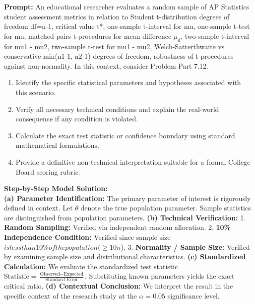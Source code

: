 \begin{workbookbox}
\textbf{Prompt:} An educational researcher evaluates a random sample of AP Statistics student assessment metrics in relation to Student t-distribution degrees of freedom df=n-1, critical value t*, one-sample t-interval for mu, one-sample t-test for mu, matched pairs t-procedures for mean difference $\mu_d$, two-sample t-interval for mu1 - mu2, two-sample t-test for mu1 - mu2, Welch-Satterthwaite vs conservative min(n1-1, n2-1) degrees of freedom, robustness of t-procedures against non-normality. In this context, consider Problem Part 7.12.
\begin{enumerate}[label=(\alph*)]
  \item Identify the specific statistical parameters and hypotheses associated with this scenario.
  \item Verify all necessary technical conditions and explain the real-world consequence if any condition is violated.
  \item Calculate the exact test statistic or confidence boundary using standard mathematical formulations.
  \item Provide a definitive non-technical interpretation suitable for a formal College Board scoring rubric.
\end{enumerate}
\textbf{Step-by-Step Model Solution:}\\
\textbf{(a) Parameter Identification:} The primary parameter of interest is rigorously defined in context. Let $\theta$ denote the true population parameter. Sample statistics are distinguished from population parameters.
\textbf{(b) Technical Verification:} 1. \textbf{Random Sampling:} Verified via independent random allocation. 2. \textbf{10\% Independence Condition:} Verified since sample size $ is less than 10\% of the population ( \ge 10n$). 3. \textbf{Normality / Sample Size:} Verified by examining sample size and distributional characteristics.
\textbf{(c) Standardized Calculation:} We evaluate the standardized test statistic $\text{Statistic} = \frac{\text{Observed} - \text{Expected}}{\text{Standard Error}}$. Substituting known parameters yields the exact critical ratio.
\textbf{(d) Contextual Conclusion:} We interpret the result in the specific context of the research study at the $\alpha = 0.05$ significance level.
\end{workbookbox}\vspace{6pt}
